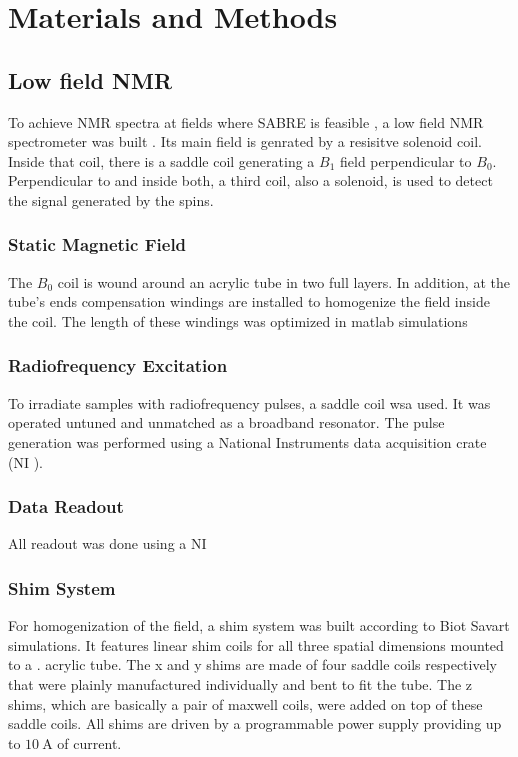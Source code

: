 \chapter{Materials and Methods}\label{chap:MaterialsAndMethods}
	\section{Low field NMR}
		To achieve NMR spectra at fields where SABRE is feasible , a low field NMR
		spectrometer was built . Its main field is genrated by a resisitve solenoid
		coil. Inside that coil, there is a saddle coil
		generating a $B_1$ field perpendicular to $B_0$. Perpendicular to and inside both, a third
		coil, also a solenoid, is used to detect the signal generated by the spins.
		\subsection{Static Magnetic Field}
			The $B_0$ coil is wound around an acrylic tube in two full layers. In addition, at the
			tube's ends compensation windings are installed to homogenize the field inside the coil.
			The length of these windings was optimized in matlab simulations 
		\subsection{Radiofrequency Excitation}
			To irradiate samples with radiofrequency pulses, a saddle coil  wsa
			used. It was operated untuned and unmatched as a broadband resonator. The pulse
			generation was performed using a National Instruments data acquisition crate (NI
			). 
		\subsection{Data Readout}
			All readout was done using a NI 
		\subsection{Shim System}
			For homogenization of the field, a shim system was built according to Biot Savart
			simulations. It features linear shim coils for all three spatial dimensions mounted to a
			. acrylic tube. The x and y shims are made of four saddle coils respectively that
			were plainly manufactured individually and bent to fit the tube. The z shims, which are
			basically a pair of maxwell coils, were added on top of these saddle coils. All shims
			are driven by a  programmable power supply providing up to $\SI{10}{\ampere}$
			of current.
